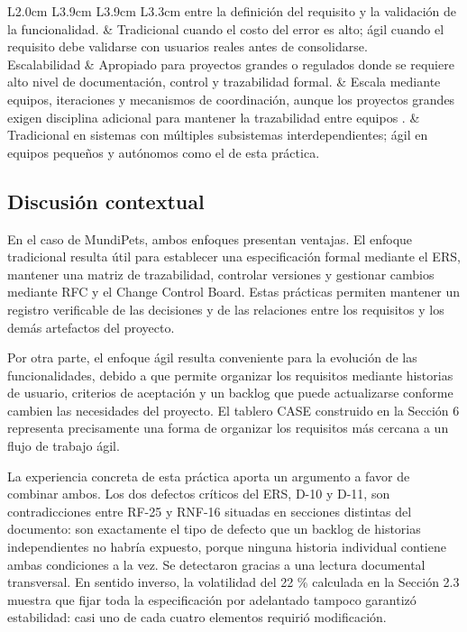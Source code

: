 \documentclass[journal,onecolumn]{IEEEtran}
\begin{document}
\begin{longtable}{L{2.0cm} L{3.9cm} L{3.9cm} L{3.3cm}}
		entre la definición del requisito y la validación de la funcionalidad. &
		Tradicional cuando el costo del error es alto; ágil cuando el requisito debe validarse con
		usuarios reales antes de consolidarse. \\
		\addlinespace
		Escalabilidad &
		Apropiado para proyectos grandes o regulados donde se requiere alto nivel de documentación,
		control y trazabilidad formal. &
		Escala mediante equipos, iteraciones y mecanismos de coordinación, aunque los proyectos
		grandes exigen disciplina adicional para mantener la trazabilidad entre equipos
		\cite{smart2014}. &
		Tradicional en sistemas con múltiples subsistemas interdependientes; ágil en equipos pequeños
		y autónomos como el de esta práctica. \\
	\end{longtable}
	
	\subsection{Discusión contextual}
	
	En el caso de MundiPets, ambos enfoques presentan ventajas. El enfoque tradicional resulta útil
	para establecer una especificación formal mediante el ERS, mantener una matriz de trazabilidad,
	controlar versiones y gestionar cambios mediante RFC y el Change Control Board. Estas prácticas
	permiten mantener un registro verificable de las decisiones y de las relaciones entre los
	requisitos y los demás artefactos del proyecto.
	
	Por otra parte, el enfoque ágil resulta conveniente para la evolución de las funcionalidades,
	debido a que permite organizar los requisitos mediante historias de usuario, criterios de
	aceptación y un backlog que puede actualizarse conforme cambien las necesidades del proyecto. El
	tablero CASE construido en la Sección 6 representa precisamente una forma de organizar los
	requisitos más cercana a un flujo de trabajo ágil.
	
	La experiencia concreta de esta práctica aporta un argumento a favor de combinar ambos. Los dos
	defectos críticos del ERS, D-10 y D-11, son contradicciones entre RF-25 y RNF-16 situadas en
	secciones distintas del documento: son exactamente el tipo de defecto que un backlog de historias
	independientes no habría expuesto, porque ninguna historia individual contiene ambas condiciones a
	la vez. Se detectaron gracias a una lectura documental transversal. En sentido inverso, la
	volatilidad del 22 \% calculada en la Sección 2.3 muestra que fijar toda la especificación por
	adelantado tampoco garantizó estabilidad: casi uno de cada cuatro elementos requirió modificación.
	
\end{document}
